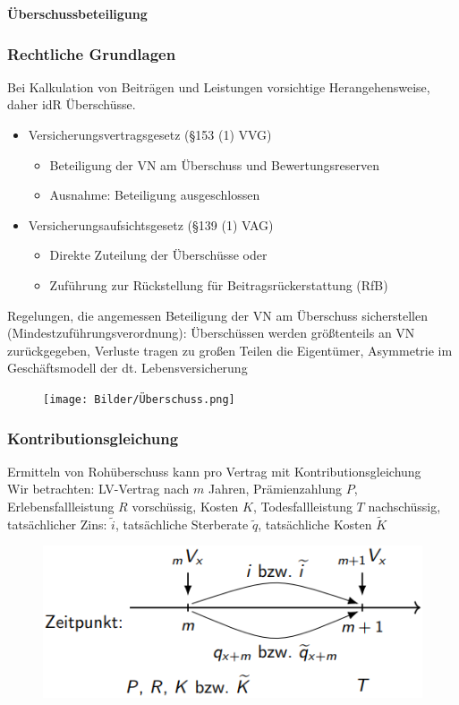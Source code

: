 \documentclass[12pt]{report}
\theoremstyle{dotless}
\theoremstyle{definition}
\begin{document}
\large \textbf{Überschussbeteiligung}
\normalsize 
\subsubsection{Rechtliche Grundlagen}
Bei Kalkulation von Beiträgen und Leistungen vorsichtige Herangehensweise, daher idR Überschüsse.
\begin{itemize}
\item Versicherungsvertragsgesetz (§153 (1) VVG)
\begin{itemize}
\item Beteiligung der VN am Überschuss und Bewertungsreserven
\item Ausnahme: Beteiligung ausgeschlossen
\end{itemize}
\item Versicherungsaufsichtsgesetz (§139 (1) VAG)
\begin{itemize}
\item Direkte Zuteilung der Überschüsse oder
\item Zuführung zur Rückstellung für Beitragsrückerstattung (RfB)
\end{itemize}
\end{itemize}
Regelungen, die angemessen Beteiligung der VN am Überschuss sicherstellen (Mindestzuführungsverordnung): Überschüssen werden größtenteils an VN zurückgegeben, Verluste tragen zu großen Teilen die Eigentümer, Asymmetrie im Geschäftsmodell der dt. Lebensversicherung

\begin{figure}[ht]
	\centering
	\texttt{[image: Bilder/Überschuss.png]}
\end{figure}

\subsubsection{Kontributionsgleichung}
Ermitteln von Rohüberschuss kann pro Vertrag mit Kontributionsgleichung \\
Wir betrachten: LV-Vertrag nach $m$ Jahren, Prämienzahlung $P$, Erlebensfallleistung $R$ vorschüssig, Kosten $K$, Todesfallleistung $T$ nachschüssig, tatsächlicher Zins: $\widetilde{i}$, tatsächliche Sterberate $\widetilde{q}$, tatsächliche Kosten $\widetilde{K}$


\begin{figure}[ht]
	\centering
	\includegraphics[width = .8\textwidth]{Bilder/Kontributionsgleichung.png}
\end{figure}
\end{document}
